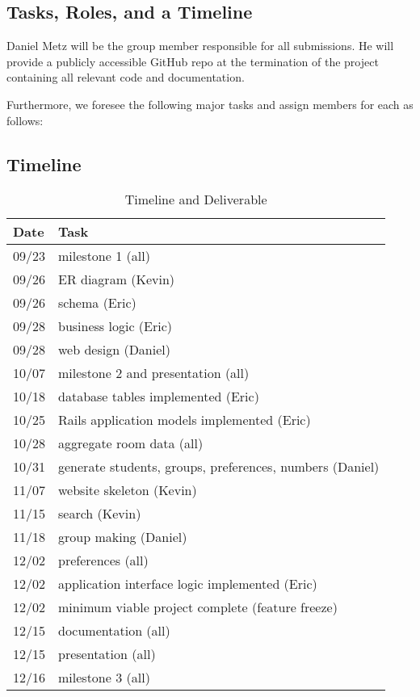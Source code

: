 \subsection{Tasks, Roles, and a Timeline}
Daniel Metz will be the group member responsible for all submissions. He will
provide a publicly accessible GitHub repo at the termination of the project
containing all relevant code and documentation.

Furthermore, we foresee the following major tasks and assign members for each as
follows:

\subsection{Timeline}

\begin{table}[H] \centering
\begin{tabular}{ll} \toprule
Date & Task \\ \midrule
09/23 & milestone 1 (all) \\ \midrule
09/26 & ER diagram (Kevin) \\
09/26 & schema (Eric) \\
09/28 & business logic (Eric) \\
09/28 & web design (Daniel) \\ \midrule
10/07 & milestone 2 and presentation (all) \\ \midrule
10/18 & database tables implemented (Eric) \\
10/25 & Rails application models implemented (Eric) \\
10/28 & aggregate room data (all) \\
10/31 & generate students, groups, preferences, numbers (Daniel) \\
11/07 & website skeleton (Kevin) \\
11/15 & search (Kevin) \\
11/18 & group making (Daniel) \\
12/02 & preferences (all) \\
12/02 & application interface logic implemented (Eric) \\
12/02 & minimum viable project complete (feature freeze) \\
12/15 & documentation (all) \\
12/15 & presentation (all) \\ \midrule
12/16 & milestone 3 (all) \\
\bottomrule
\end{tabular}
\caption{Timeline and Deliverable}
\end{table}